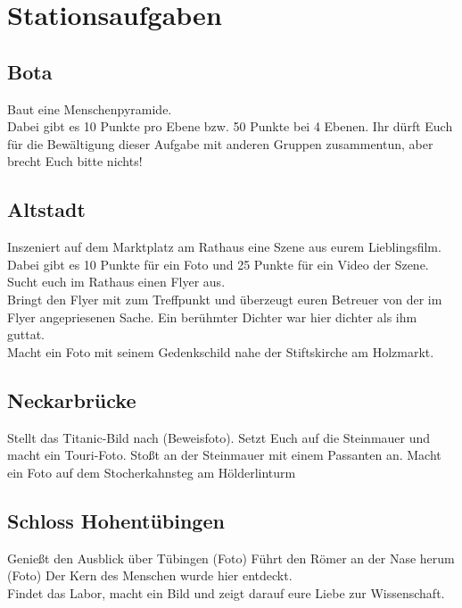 \documentclass[11pt,paper=a4,answers]{exam}
\renewenvironment{questions}{
	\begin{q}
		\pointsinrightmargin
		\marginpointname{\ Pkt}
		\bracketedpoints }{
	\end{q}}
\begin{document}
\section*{Stationsaufgaben}
\subsection*{Bota}
\begin{questions}
\question[10-50] Baut eine Menschenpyramide. \\
Dabei gibt es 10 Punkte pro Ebene bzw. 50 Punkte bei 4 Ebenen. Ihr dürft Euch für die Bewältigung dieser Aufgabe mit anderen Gruppen zusammentun, aber brecht Euch bitte nichts!

\end{questions}

\subsection*{Altstadt}
\begin{questions}
\question[10-25] Inszeniert auf dem Marktplatz am Rathaus eine Szene aus eurem Lieblingsfilm. \\
Dabei gibt es 10 Punkte für ein Foto und 25 Punkte für ein Video der Szene.
\question[10] Sucht euch im Rathaus einen Flyer aus. \\
Bringt den Flyer mit zum Treffpunkt und überzeugt euren Betreuer von der im Flyer angepriesenen Sache.
\question[10] Ein berühmter Dichter war hier dichter als ihm guttat. \\
Macht ein Foto mit seinem Gedenkschild nahe der Stiftskirche am Holzmarkt.

\end{questions}

\subsection*{Neckarbrücke}
\begin{questions}
	\question[10] Stellt das Titanic-Bild nach (Beweisfoto).
	\question[10] Setzt Euch auf die Steinmauer und macht ein Touri-Foto. 
	\question[5] Stoßt an der Steinmauer mit einem Passanten an.
	 Macht ein Foto auf dem Stocherkahnsteg am Hölderlinturm

\end{questions}

\subsection*{Schloss Hohentübingen}
\begin{questions}
	\question[10] Genießt den Ausblick über Tübingen (Foto)
	\question[10] Führt den Römer an der Nase herum (Foto)
	\question[10] Der Kern des Menschen wurde hier entdeckt.\\
Findet das Labor, macht ein Bild und zeigt darauf eure Liebe zur Wissenschaft.

\end{questions}
\end{document}
